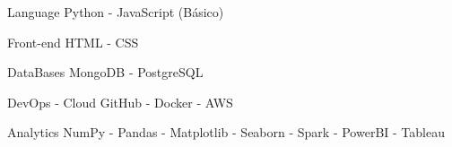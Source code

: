 


\begin{cvskills}


\cvskill
{Language} %
{Python - JavaScript (Básico)} %


\cvskill
{Front-end} %
{HTML - CSS} %


\cvskill
{DataBases} %
{MongoDB - PostgreSQL} %


\cvskill
{DevOps - Cloud} %
{GitHub - Docker - AWS} %


\cvskill
{Analytics} %
{NumPy - Pandas - Matplotlib - Seaborn - Spark - PowerBI - Tableau} %




\end{cvskills}